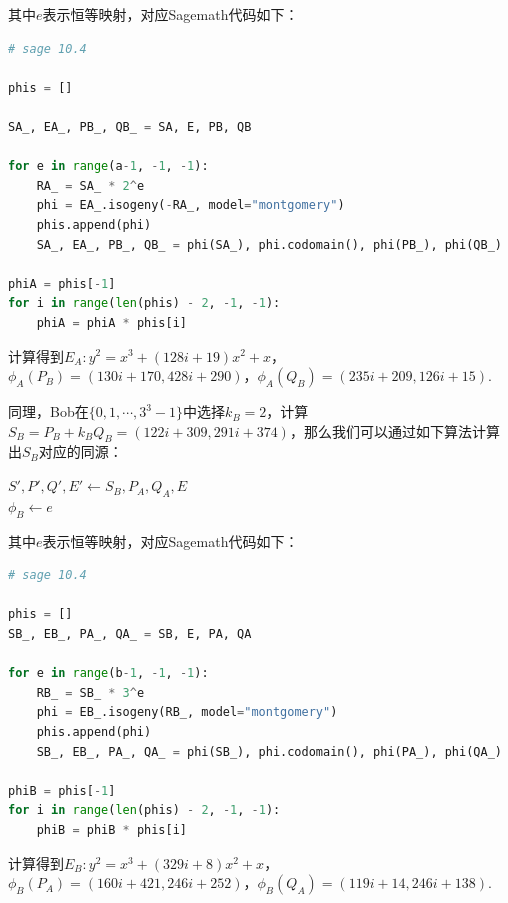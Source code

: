 \documentclass{book}
\numberwithin{equation}{subsubsection}
\begin{document}
其中$e$表示恒等映射，对应Sagemath代码如下：
\begin{lstlisting}[language=Python,basicstyle=\ttfamily,breaklines=true,keywordstyle=\bfseries\color{blue}]
# sage 10.4

phis = []

SA_, EA_, PB_, QB_ = SA, E, PB, QB

for e in range(a-1, -1, -1):
    RA_ = SA_ * 2^e
    phi = EA_.isogeny(-RA_, model="montgomery")
    phis.append(phi)
    SA_, EA_, PB_, QB_ = phi(SA_), phi.codomain(), phi(PB_), phi(QB_)

phiA = phis[-1]
for i in range(len(phis) - 2, -1, -1):
    phiA = phiA * phis[i]
\end{lstlisting}
计算得到$E_A:y^2 = x^3 + (128i+19)x^2 + x$，$\phi_A(P_B)=(130i + 170,428i + 290)$，$\phi_A(Q_B)=(235i+209,126i+15)$.\par
同理，Bob在$\{0,1,\cdots,3^3-1\}$中选择$k_B=2$，计算$S_B=P_B+k_BQ_B=(122i +309, 291i+374)$，那么我们可以通过如下算法计算出$S_B$对应的同源：\\
\begin{algorithm}[H]
    \caption{同源路径算法（Bob侧）}
    $S',P',Q',E'\leftarrow S_B,P_A,Q_A,E$\\
    $\phi_B\leftarrow e$
\end{algorithm}
\noindent
其中$e$表示恒等映射，对应Sagemath代码如下：
\begin{lstlisting}[language=Python,basicstyle=\ttfamily,breaklines=true,keywordstyle=\bfseries\color{blue}]
# sage 10.4

phis = []
SB_, EB_, PA_, QA_ = SB, E, PA, QA

for e in range(b-1, -1, -1):
    RB_ = SB_ * 3^e
    phi = EB_.isogeny(RB_, model="montgomery")
    phis.append(phi)
    SB_, EB_, PA_, QA_ = phi(SB_), phi.codomain(), phi(PA_), phi(QA_)

phiB = phis[-1]
for i in range(len(phis) - 2, -1, -1):
    phiB = phiB * phis[i]
\end{lstlisting}
计算得到$E_B:y^2 = x^3 + (329i+8)x^2 + x$，$\phi_B(P_A)=(160i + 421, 246i + 252)$，$\phi_B(Q_A)=(119i+14, 246i + 138)$.\par
\end{document}
